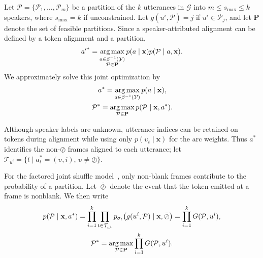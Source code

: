 
Let $\mathcal{P}=\{\mathcal{P}_{1},\ldots,\mathcal{P}_{m}\}$ be a partition
of the $k$ utterances in $\mathcal{G}$ into $m\leq s_{\max}\leq k$ speakers,
where $s_{\max}=k$ if unconstrained. Let $g(u^i,\mathcal{P})=j$ if
$u^i\in\mathcal{P}_{j}$, and let $\mathbf{P}$ denote the set of feasible
partitions. Since a speaker-attributed alignment can be defined by a token
alignment and a partition,
\begin{equation}
{a^\prime}^*
=
\operatorname*{arg\,max}_{\substack{a\in\beta^{-1}(\mathcal{Y})\\
                   \mathcal{P}\in\mathbf{P}}}
p(a\mid\mathbf{x})p(\mathcal{P}\mid a,\mathbf{x}).
\end{equation}
We approximately solve this joint optimization by
\begin{equation}
\begin{gathered}
a^*
=
\operatorname*{arg\,max}_{a\in\beta^{-1}(\mathcal{Y})}
p(a\mid\mathbf{x}),\\
\mathcal{P}^*
=
\operatorname*{arg\,max}_{\mathcal{P}\in\mathbf{P}}
p(\mathcal{P}\mid\mathbf{x},a^*).
\end{gathered}
\end{equation}

Although speaker labels are unknown, utterance indices can be retained on
tokens during alignment while using only $p(\upsilon_t\mid\mathbf{x})$ for
the arc weights. Thus $a^*$ identifies the non-$\oslash$ frames aligned to
each utterance; let
$\mathcal{T}_{u^i}=\{t\mid a_t^*=(\upsilon,i),\,\upsilon\neq\oslash\}$.

For the factored joint shuffle model~\cite{wiesner2026modeling}, only
non-blank frames contribute to the probability of a partition. Let
$\bar{\oslash}$ denote the event that the token emitted at a frame is
nonblank. We then write
\begin{equation}
\begin{gathered}
p(\mathcal{P}\mid\mathbf{x},a^*)
=
\prod_{i=1}^{k}\prod_{t\in\mathcal{T}_{u^i}}
p_{\sigma_t}\!\left(
g(u^i,\mathcal{P})\mid\mathbf{x},\bar{\oslash}
\right)
=
\prod_{i=1}^{k}G(\mathcal{P},u^i),\\
\mathcal{P}^*
=
\operatorname*{arg\,max}_{\mathcal{P}\in\mathbf{P}}
\prod_{i=1}^{k}G(\mathcal{P},u^i).
\end{gathered}
\end{equation}

